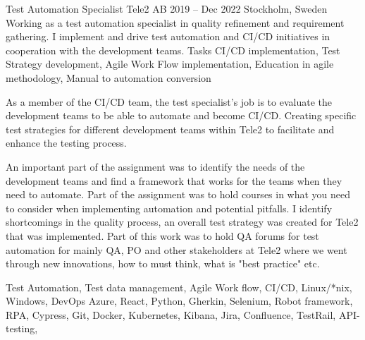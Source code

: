 \documentclass{sobCV}[2015/09/08]
\begin{document}
\experiencenode
   {Test Automation Specialist}
   {Tele2 AB}
   {2019 -- Dec 2022}
   {Stockholm, Sweden}{
       Working as a test automation specialist in quality refinement and
       requirement gathering. I implement and drive test automation and CI/CD
       initiatives in cooperation with the development teams.
   }
   {Tasks}{
      CI/CD implementation,
      Test Strategy development, 
      Agile Work Flow implementation,
      Education in agile methodology,
      Manual to automation conversion
   }{
        {
           As a member of the CI/CD team, the test specialist's job is to
           evaluate the development teams to be able to automate and become
           CI/CD. Creating specific test strategies for different development
           teams within Tele2 to facilitate and enhance the testing process.
       }

        {
           An important part of the assignment was to identify the needs of the
           development teams and find a framework that works for the teams when
           they need to automate. Part of the assignment was to hold courses in
           what you need to consider when implementing automation and potential
           pitfalls.
       }
        {
           I identify shortcomings in the quality process, an overall test
           strategy was created for Tele2 that was implemented. Part of this
           work was to hold QA forums for test automation for mainly QA, PO and
           other stakeholders at Tele2 where we went through new innovations,
           how to must think, what is "best practice" etc.
       }
   }{
       Test Automation,
       Test data management,
       Agile Work flow, 
       CI/CD, 
       Linux/*nix, 
       Windows, 
       DevOps Azure, 
       React, 
       Python, 
       Gherkin, 
       Selenium, 
       Robot framework,
       RPA,
       Cypress, 
       Git, 
       Docker, 
       Kubernetes, 
       Kibana, 
       Jira, 
       Confluence, 
       TestRail, 
       API-testing, 
   }
   
\end{document}
